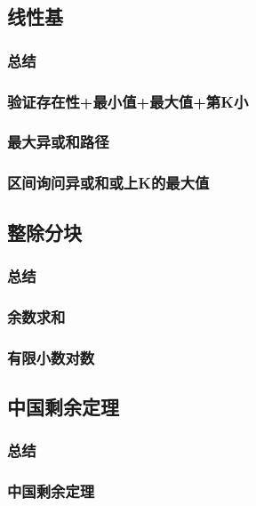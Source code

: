 \documentclass[10pt,a4paper]{article}
\begin{document}
\subsection{线性基}
\subsubsection{总结}

\subsubsection{验证存在性+最小值+最大值+第K小}

\subsubsection{最大异或和路径}

\subsubsection{区间询问异或和或上K的最大值}

\subsection{整除分块}
\subsubsection{总结}

\subsubsection{余数求和}

\subsubsection{有限小数对数}

\subsection{中国剩余定理}
\subsubsection{总结}

\subsubsection{中国剩余定理}

\end{document}
